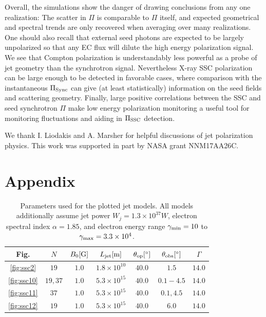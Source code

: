Overall, the simulations show the danger of drawing conclusions from any one realization: The scatter in $\Pi$ is comparable to $\Pi$ itself, and expected geometrical and spectral trends are only recovered when averaging over many realizations. One should also recall that external seed photons are expected to be largely unpolarized so that any EC flux will dilute the high energy polarization signal. We see that Compton polarization is understandably less powerful as a probe of jet geometry than the synchrotron signal. Nevertheless X-ray SSC polarization can be large enough to be detected in favorable cases, where comparison with the instantaneous $\Pi_{\rm Sync}$ can give (at least statistically) information on the seed fields and scattering geometry. Finally, large positive correlations between the SSC and seed synchrotron $\Pi$ make low energy polarization monitoring a useful tool for monitoring fluctuations and aiding in $\Pi_{\rm SSC}$ detection.
\bigskip

We thank I. Liodakis and A. Marsher for helpful discussions of jet polarization physics. This work was supported in part by NASA grant NNM17AA26C.

\section{Appendix}
\begin{table}[h!]
\centering
\begin{tabular}{c c c c c c c} 
\toprule
Fig. & $N$ & $B_0[{\rm G}]$ & $L_{\rm jet}[{\rm m}]$ & $\theta_{\rm op}[^{\circ}]$ & $\theta_{\rm obs}[^{\circ}]$ & $\Gamma$ \\ 
\midrule
\ref{fig:ssc2} & $19$ & $1.0$ & $1.8 \times 10^{10}$ & $40.0$ & $1.5$ & $14.0$ \\ 
\ref{fig:ssc10} & $19,37$ & $1.0$ & $5.3 \times 10^{15}$ & $40.0$ & $0.1-4.5$ & $14.0$ \\ 
\ref{fig:ssc11} & $37$ & $1.0$ & $5.3 \times 10^{15}$ & $40.0$ & $0.1,4.5$ & $14.0$ \\ 
\ref{fig:ssc12} & $19$ & $1.0$ & $5.3 \times 10^{15}$ & $40.0$ & $6.0$ & $14.0$ \\ 
\bottomrule
\end{tabular}
\caption{
Parameters used for the plotted jet models. All models additionally assume jet power $W_j = 1.3 \times 10^{37}W$, electron spectral index $\alpha = 1.85$, and electron energy range $\gamma_{\rm min}=10$ to $\gamma_{\rm max}=3.3 \times 10^{4}$.
}
\end{table}

